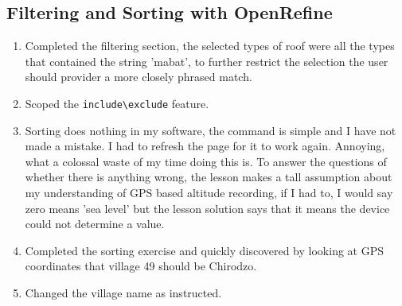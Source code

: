 \documentclass{article}
\begin{document}
\subsection{Filtering and Sorting with OpenRefine}
\begin{enumerate}
    \item Completed the filtering section, the selected types of roof were all the types that contained the string 'mabat', to further restrict the selection the user should provider a more closely phrased match.
    \item Scoped the \verb|include\exclude| feature.
    \item Sorting does nothing in my software, the command is simple and I have not made a mistake. I had to refresh the page for it to work again. Annoying, what a colossal waste of my time doing this is. To answer the questions of whether there is anything wrong, the lesson makes a tall assumption about my understanding of GPS based altitude recording, if I had to, I would say zero means 'sea level' but the lesson solution says that it means the device could not determine a value. 
    \item Completed the sorting exercise and quickly discovered by looking at GPS coordinates that village 49 should be Chirodzo.
    \item Changed the village name as instructed.
\end{enumerate}
\end{document}
